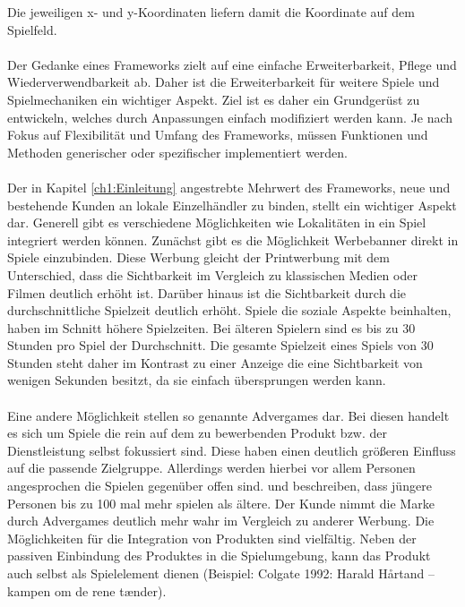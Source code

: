 Die jeweiligen x- und y-Koordinaten liefern damit die Koordinate auf dem Spielfeld.
\\\\
Der Gedanke eines Frameworks zielt auf eine einfache Erweiterbarkeit, Pflege und Wiederverwendbarkeit ab. Daher ist die Erweiterbarkeit für weitere Spiele und Spielmechaniken ein wichtiger Aspekt.
Ziel ist es daher ein Grundgerüst zu entwickeln, welches durch Anpassungen einfach modifiziert werden kann.
Je nach Fokus auf Flexibilität und Umfang des Frameworks, müssen Funktionen und Methoden generischer oder spezifischer implementiert werden.
\\\\
Der in Kapitel \ref{ch1:Einleitung} angestrebte Mehrwert des Frameworks, neue und bestehende Kunden an lokale Einzelhändler zu binden, stellt ein wichtiger Aspekt dar. Generell gibt es verschiedene Möglichkeiten wie Lokalitäten in ein Spiel integriert werden können.\cite{Nelson.2002}
Zunächst gibt es die Möglichkeit Werbebanner direkt in Spiele einzubinden.\cite{Nelson.2004} Diese Werbung gleicht der Printwerbung mit dem Unterschied, dass die Sichtbarkeit im Vergleich zu klassischen Medien oder Filmen deutlich erhöht ist.\cite{Edery.2008} Darüber hinaus ist die Sichtbarkeit durch die durchschnittliche Spielzeit deutlich erhöht. Spiele die soziale Aspekte beinhalten, haben im Schnitt höhere Spielzeiten.\cite{Ducheneaut.2006} Bei älteren Spielern sind es bis zu 30 Stunden pro Spiel der Durchschnitt. Die gesamte Spielzeit eines Spiels von 30 Stunden steht daher im Kontrast zu einer Anzeige  die eine Sichtbarkeit von wenigen Sekunden besitzt, da sie einfach übersprungen werden kann.
\\\\
Eine andere Möglichkeit stellen so genannte Advergames dar. Bei diesen handelt es sich um Spiele die rein auf dem zu bewerbenden Produkt bzw. der Dienstleistung selbst fokussiert sind.
Diese haben einen deutlich größeren Einfluss auf die passende Zielgruppe. Allerdings werden hierbei vor allem Personen angesprochen die Spielen gegenüber offen sind.\cite{Winkler.2006}
\textcite{Chen.2001} und \textcite{Dahl.2009} beschreiben, dass jüngere Personen bis zu 100 mal mehr spielen als ältere.
Der Kunde nimmt die Marke durch Advergames deutlich mehr wahr im Vergleich zu anderer Werbung.
Die Möglichkeiten für die Integration von Produkten sind vielfältig. Neben der passiven Einbindung des Produktes in die Spielumgebung, kann das Produkt auch selbst als Spielelement dienen (Beispiel: Colgate 1992: Harald Hårtand -- kampen om de rene tænder).
